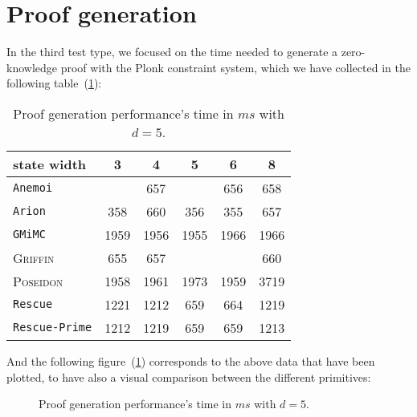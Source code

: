\documentclass[12pt, a4paper]{report}
\begin{document}
\section{Proof generation}\label{sec:proofgen}

In the third test type, we focused on the time needed to generate a zero-knowledge proof with the Plonk constraint system, which we have collected in the following table~(\ref{tab:proofgen}):

\begin{table}[H]
  \caption{Proof generation performance's time in $ms$ with $d = 5$.}\label{tab:proofgen}
  \begin{center}
    \begin{tabular}{|l|c|c|c|c|c|}
      \hline
        state width & 3 & 4 & 5 & 6 & 8 \\
      \hline
        \texttt{Anemoi} & & 657 &  & 656 & 658 \\
        \texttt{Arion} & 358 & 660 & 356 & \cellcolor{green!35} 355 & 657 \\
        \texttt{GMiMC} & \cellcolor{orange!35} 1959 & \cellcolor{orange!35} 1956 & \cellcolor{orange!35} 1955 & \cellcolor{orange!35} 1966 & \cellcolor{orange!35} 1966 \\
        \textsc{Griffin} & 655 & 657 & & & 660 \\
        \textsc{Poseidon} & \cellcolor{orange!35} 1958 & \cellcolor{orange!35} 1961 & \cellcolor{orange!35} 1973 & \cellcolor{orange!35} 1959 & \cellcolor{red!35} 3719 \\
        \texttt{Rescue} & \cellcolor{orange!35} 1221 & \cellcolor{orange!35} 1212 & 659 & 664 & \cellcolor{orange!35} 1219 \\
        \texttt{Rescue-Prime} & \cellcolor{orange!35} 1212 & \cellcolor{orange!35} 1219 & 659 & 659 & \cellcolor{orange!35} 1213 \\
      \hline
    \end{tabular}
  \end{center}
\end{table}

And the following figure~(\ref{plot:proofgen}) corresponds to the above data that have been plotted, to have also a visual comparison between the different primitives:

\begin{figure}[H]
  \hspace{60pt}
  \caption{Proof generation performance's time in $ms$ with $d = 5$.}\label{plot:proofgen}
\end{figure}
\end{document}
